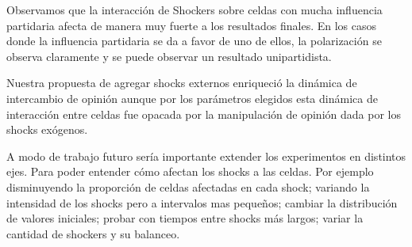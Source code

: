 
Observamos que la interacción de Shockers sobre celdas con mucha influencia
partidaria afecta de manera muy fuerte a los resultados finales.
En los casos donde la influencia partidaria se da a favor de uno de ellos, la
polarización se observa claramente y se puede observar un resultado
unipartidista.


Nuestra propuesta de agregar shocks externos enriqueció la dinámica de
intercambio de opinión aunque por los parámetros elegidos esta dinámica de
interacción entre celdas fue opacada por la manipulación de opinión dada por
los shocks exógenos.


A modo de trabajo futuro sería importante extender los experimentos en
distintos ejes. Para poder entender cómo afectan los shocks a las celdas. Por
ejemplo disminuyendo la proporción de celdas afectadas en cada shock; variando la 
intensidad de los shocks pero a intervalos mas pequeños;
cambiar la distribución de valores iniciales; probar con tiempos entre shocks
más largos; variar la cantidad de shockers y su balanceo.


